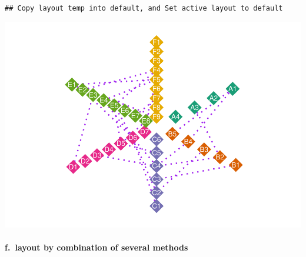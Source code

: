 \documentclass[
]{article}
\let\oldparagraph\paragraph
\renewcommand{\paragraph}[1]{\oldparagraph{#1}\mbox{}}
\begin{document}
\begin{verbatim}
## Copy layout temp into default, and Set active layout to default
\end{verbatim}

\includegraphics{ReadMe_files/figure-latex/unnamed-chunk-14-1.pdf}

\hypertarget{f.-layout-by-combination-of-several-methods}{%
\paragraph{f.~layout by combination of several
methods}\label{f.-layout-by-combination-of-several-methods}}
\end{document}
